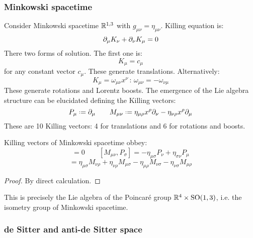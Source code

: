 \subsubsection{Minkowski spacetime}

Consider Minkowski spacetime $ \mathbb{R}^{1,3} $ with $ g_{\mu \nu} = \eta_{\mu \nu} $. Killing equation is:
\begin{equation*}
  \partial_\mu K_\nu + \partial_\nu K_\mu = 0
\end{equation*}
There two forms of solution. The first one is:
\begin{equation*}
  K_\mu = c_\mu
\end{equation*}
for any constant vector $ c_\mu $. These generate translations. Alternatively:
\begin{equation*}
  K_\mu = \omega_{\mu \nu} x^\nu
  \,:\, \omega_{\mu \nu} = - \omega_{\nu \mu}
\end{equation*}
These generate rotations and Lorentz boosts. The emergence of the Lie algebra structure can be elucidated defining the Killing vectors:
\begin{equation*}
  P_\mu \defeq \pa_\mu
  \qquad
  M_{\mu \nu} \defeq \eta_{\mu \rho} x^\rho \pa_\nu - \eta_{\nu \rho} x^\rho \pa_\mu
\end{equation*}
These are 10 Killing vectors: 4 for translations and 6 for rotations and boosts.

\begin{proposition}
  Killing vectors of Minkowski spacetime obbey:
  \begin{equation*}
    [P_\mu, P_\nu] = 0
    \qquad
    [M_{\mu \nu}, P_\sigma] = - \eta_{\mu \sigma} P_\nu + \eta_{\sigma \nu} P_\mu
  \end{equation*}
  \begin{equation*}
    [M_{\mu \nu}, M_{\rho \sigma}] = \eta_{\mu \sigma} M_{\nu \rho} + \eta_{\nu \rho} M_{\mu \sigma} - \eta_{\mu \rho} M_{\nu \sigma} - \eta_{\nu \sigma} M_{\mu \rho}
  \end{equation*}
\end{proposition}
\begin{proof}
  By direct calculation.
\end{proof}

This is precisely the Lie algebra of the Poincaré group $ \mathbb{R}^4 \times \mathrm{SO}(1,3) $, i.e. the isometry group of Minkowski spacetime.

\subsubsection{de Sitter and anti-de Sitter space}

